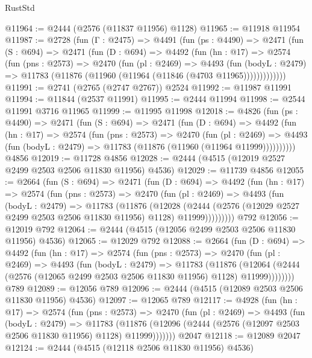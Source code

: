 \begin{lexlean}{RustStd}
\begin{coremodule}
@11964 := @2444 (@2576 (@11837 @11956) @1128)
@11965 := @11918 @11954
@11987 := @2728
    (fun (Γ : @2475) =>
    @4491
      (fun (ps : @4490) =>
      @2471
        (fun (S : @694) =>
        @2471
          (fun (D : @694) =>
          @4492
            (fun (hn : @17) =>
            @2574
              (fun (pns : @2573) =>
              @2470
                (fun (pl : @2469) =>
                @4493
                  (fun (bodyL : @2479) =>
                  @11783 (@11876 (@11960 (@11964 (@11846 (@4703 @11965)))))))))))))
@11991 := @2741 (@2765 (@2747 @2767)) @2524
@11992 := @11987 @11991
@11994 := @11844 (@2537 @11991)
@11995 := @2444 @11994
@11998 := @2544 @11991 @3716 @11965
@11999 := @11995 @11998
@12018 := @4826
    (fun (ps : @4490) =>
    @2471
      (fun (S : @694) =>
      @2471
        (fun (D : @694) =>
        @4492
          (fun (hn : @17) =>
          @2574
            (fun (pns : @2573) =>
            @2470
              (fun (pl : @2469) =>
              @4493 (fun (bodyL : @2479) => @11783 (@11876 (@11960 (@11964 @11999))))))))))
    @4856
@12019 := @11728 @4856
@12028 := @2444 (@4515 (@12019 @2527 @2499 @2503 @2506 @11830 @11956) @4536)
@12029 := @11739 @4856
@12055 := @2664
    (fun (S : @694) =>
    @2471
      (fun (D : @694) =>
      @4492
        (fun (hn : @17) =>
        @2574
          (fun (pns : @2573) =>
          @2470
            (fun (pl : @2469) =>
            @4493
              (fun (bodyL : @2479) =>
              @11783
                (@11876
                  (@12028
                    (@2444
                      (@2576 (@12029 @2527 @2499 @2503 @2506 @11830 @11956) @1128)
                      @11999)))))))))
    @792
@12056 := @12019 @792
@12064 := @2444 (@4515 (@12056 @2499 @2503 @2506 @11830 @11956) @4536)
@12065 := @12029 @792
@12088 := @2664
    (fun (D : @694) =>
    @4492
      (fun (hn : @17) =>
      @2574
        (fun (pns : @2573) =>
        @2470
          (fun (pl : @2469) =>
          @4493
            (fun (bodyL : @2479) =>
            @11783
              (@11876
                (@12064 (@2444 (@2576 (@12065 @2499 @2503 @2506 @11830 @11956) @1128) @11999))))))))
    @789
@12089 := @12056 @789
@12096 := @2444 (@4515 (@12089 @2503 @2506 @11830 @11956) @4536)
@12097 := @12065 @789
@12117 := @4928
    (fun (hn : @17) =>
    @2574
      (fun (pns : @2573) =>
      @2470
        (fun (pl : @2469) =>
        @4493
          (fun (bodyL : @2479) =>
          @11783
            (@11876 (@12096 (@2444 (@2576 (@12097 @2503 @2506 @11830 @11956) @1128) @11999)))))))
    @2047
@12118 := @12089 @2047
@12124 := @2444 (@4515 (@12118 @2506 @11830 @11956) @4536)

\end{coremodule}
\end{lexlean}
